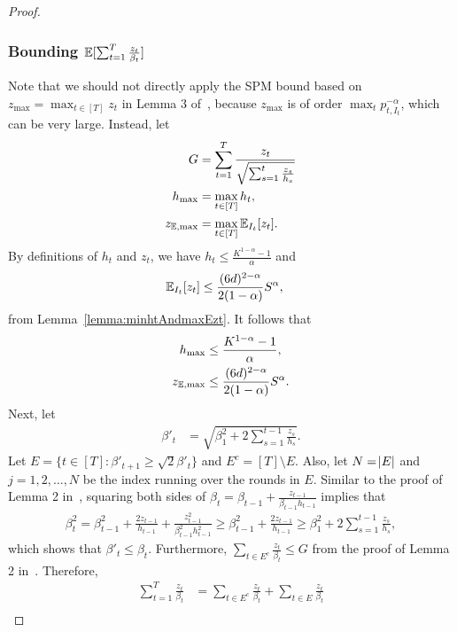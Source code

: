 \begin{proof}
\subsubsection*{Bounding $\mathbb{E}[\sum_{t=1}^T \frac{z_t}{\beta_t}]$}
Note that we should not directly apply the SPM bound based on $z_{\max} = \max_{t \in [T]}z_t$ in Lemma 3 of~\cite{ItoCOLT2024}, because $z_{\max}$ is of order 
{$\max_t p_{t,I_t}^{-\alpha}$}, which can be very large.
Instead, let
\begin{align*}
    G &= \sum_{t=1}^T \frac{z_t}{\sqrt{\sum_{s=1}^t \frac{z_s}{h_s}}} \\
    h_{\max} &= \max_{t \in [T]}h_t, \\
    z_{\mathbb{E}, \max} &= \max_{t \in [T]}\mathbb{E}_{I_t}[z_t].
\end{align*}
By definitions of $h_t$ and $z_t$, we have $h_t \leq \frac{K^{1-\alpha} - 1}{\alpha}$ and
\begin{align*}
    \mathbb{E}_{I_t}[z_t] &\leq \frac{(6d)^{2-\alpha}}{2(1-\alpha)} S^{\alpha},
\end{align*}
from Lemma~\ref{lemma:minhtAndmaxEzt}. It follows that 
\begin{align*}
    h_{\max} &\leq \frac{K^{1-\alpha} - 1}{\alpha}, \\
    z_{\mathbb{E}, \max} &\leq \frac{(6d)^{2-\alpha}}{2(1-\alpha)} S^{\alpha}.
\end{align*}
Next, let
\begin{align}
\beta'_t &= \sqrt{\beta_{1}^2 + 2\sum_{s=1}^{t-1}\frac{z_{s}}{h_s}}.
\end{align}
Let $E = \{t \in [T]: \beta'_{t+1} \geq \sqrt{2}\beta'_t\}$ and $E^c = [T] \setminus E$. Also, let $N = \abs{E}$ and $j = 1, 2, \dots, N$ be the index running over the rounds in $E$. 
Similar to the proof of Lemma 2 in~\citet{ItoCOLT2024}, squaring both sides of $\beta_t = \beta_{t-1} + \frac{z_{t-1}}{\beta_{t-1}h_{t-1}}$ implies that
\begin{align*}
    \beta_t^2 = \beta_{t-1}^2 + \frac{2z_{t-1}}{h_{t-1}} + \frac{z_{t-1}^2}{\beta_{t-1}^2 h_{t-1}^2} \geq \beta_{t-1}^2 + \frac{2z_{t-1}}{h_{t-1}} \geq \beta_1^2 + 2\sum_{s=1}^{t-1} \frac{z_s}{h_s},
\end{align*}
 which shows that 
 {$\beta'_t \leq \beta_t$}. Furthermore,
 {$\sum_{t \in E^c} \frac{z_t}{\beta_t} \leq G$} from the proof of Lemma 2 in~\citet{ItoCOLT2024}. Therefore, 
\begin{align*}
    \sum_{t=1}^T \frac{z_t}{\beta_t} &= \sum_{t \in E^c} \frac{z_t}{\beta_t} +  \sum_{t \in E} \frac{z_t}{\beta_t} \\

\end{align*}
\end{proof}
